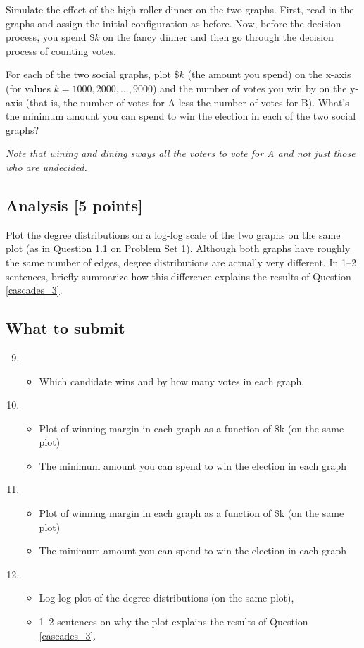 Simulate the effect of the high roller dinner on the two graphs. First, read in
the graphs and assign the initial configuration as before. Now, before the
decision process, you spend \$$k$ on the fancy dinner and then go through the
decision process of counting votes.

For each of the two social graphs, plot \$$k$ (the amount you spend) on the
x-axis (for values $k = 1000, 2000, \ldots, 9000$) and the number of votes you
win by on the y-axis (that is, the number of votes for A less the number of votes for B).
What's the minimum amount you can spend to win the election in each of the two social graphs?

\emph{Note that wining and dining sways all the voters to vote for A and not
  just those who are undecided.}

\subsection{Analysis [5 points]}
Plot the degree distributions on a log-log scale of the two graphs on the same
plot (as in Question 1.1 on Problem Set 1).  Although both graphs have roughly
the same number of edges, degree distributions are actually very different.
In 1--2 sentences, briefly
summarize how this difference explains the results of 
Question \ref{cascades_3}.

\subsection*{What to submit}
\begin{enumerate}[{Page} 1:]
\setcounter{enumi}{8}
\item 
\begin{itemize}
\item Which candidate wins and by how many votes in each graph.
\end{itemize}
 
\item
\begin{itemize}
\item Plot of winning margin in each graph as a function of \$k (on the same plot)
\item The minimum amount you can spend to win the election in each graph
\end{itemize}
 
\item
\begin{itemize}
\item Plot of winning margin in each graph as a function of \$k (on the same plot)
\item The minimum amount you can spend to win the election in each graph
\end{itemize}
 
\item
\begin{itemize}
\item Log-log plot of the degree distributions (on the same plot),
\item 1--2 sentences on why the plot explains the results of Question \ref{cascades_3}.
\end{itemize}
\end{enumerate}
